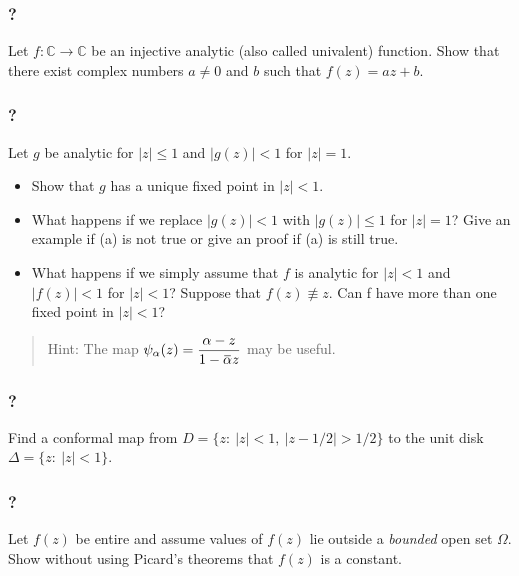 \hypertarget{section-111}{%
\subsubsection{?}\label{section-111}}

Let \(f: {\mathbb C} \rightarrow {\mathbb C}\) be an injective analytic
(also called univalent) function. Show that there exist complex numbers
\(a \neq 0\) and \(b\) such that \(f(z) = az + b\).

\hypertarget{section-112}{%
\subsubsection{?}\label{section-112}}

Let \(g\) be analytic for \(|z|\leq 1\) and \(|g(z)| < 1\) for
\(|z| = 1\).

\begin{itemize}
\item
  Show that \(g\) has a unique fixed point in \(|z| < 1\).
\item
  What happens if we replace \(|g(z)| < 1\) with \(|g(z)|\leq 1\) for
  \(|z|=1\)? Give an example if (a) is not true or give an proof if (a)
  is still true.
\item
  What happens if we simply assume that \(f\) is analytic for
  \(|z| < 1\) and \(|f(z)| < 1\) for \(|z| < 1\)? Suppose that
  \(f(z) \not\equiv z\). Can f have more than one fixed point in
  \(|z| < 1\)?
\end{itemize}

\begin{quote}
Hint: The map
\(\displaystyle{\psi_{\alpha}(z)=\frac{\alpha-z}{1-\mkern 1.5mu\overline{\mkern-1.5mu\alpha\mkern-1.5mu}\mkern 1.5muz}}\)
may be useful.
\end{quote}

\hypertarget{section-113}{%
\subsubsection{?}\label{section-113}}

Find a conformal map from \(D = \{z :\  |z| < 1,\ |z - 1/2| > 1/2\}\) to
the unit disk \(\Delta=\{z: \ |z|<1\}\).

\hypertarget{section-114}{%
\subsubsection{?}\label{section-114}}

Let \(f(z)\) be entire and assume values of \(f(z)\) lie outside a
\emph{bounded} open set \(\Omega\). Show without using Picard's theorems
that \(f(z)\) is a constant.

